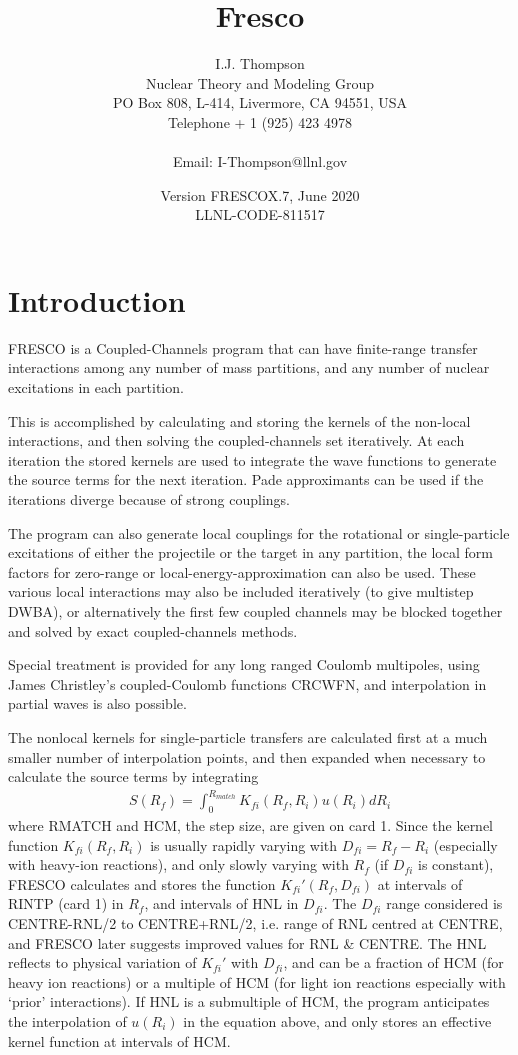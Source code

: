 \documentclass[11pt]{article}
\title{\Huge Fresco}
\date{Version FRESCOX.7, June 2020\\ LLNL-CODE-811517 }
\author{I.J. Thompson
%
\\Nuclear Theory and Modeling Group
\\PO Box 808, L-414,
 Livermore, CA 94551, USA
\\Telephone + 1 (925) 423 4978
\\ %
\\Email: I-Thompson@llnl.gov}
\newcommand{\beqn}{\begin{eqnarray*}}
\newcommand{\eeqn}{\end{eqnarray*}}
\begin{document}
\maketitle
\section{Introduction}

{\large
\parskip 5pt
\parindent 10pt

FRESCO is a Coupled-Channels program that can have finite-range
transfer interactions among any number of mass partitions, and any
number of nuclear excitations in each partition.

This is accomplished by calculating and storing the kernels of the
non-local interactions, and then solving the coupled-channels set
iteratively.
At each iteration the stored kernels are used to integrate the wave
functions to generate the source terms for the next iteration.
Pade approximants can be used if the iterations diverge because of
strong couplings.

The program can also generate local couplings for the rotational
or single-particle excitations of either the projectile or the
target in any partition,
the local form factors for zero-range or local-energy-approximation
can also be used.
These various local interactions may also be included iteratively
(to give multistep DWBA), or alternatively the first few coupled
channels may be blocked together and solved by exact coupled-channels
methods.

Special treatment is provided for any long ranged Coulomb multipoles,
using James Christley's coupled-Coulomb functions CRCWFN,
and interpolation in partial waves is also possible.

The nonlocal kernels for single-particle transfers are calculated first
at a much smaller number of interpolation points,
and then expanded when necessary to calculate the source terms by
integrating
\beqn
S(R _ f ) = \int _ 0 ^ {R _ {match}}
                K _ {fi} (R _ f , R _ i ) u(R _ i ) dR _ i
\eeqn
where RMATCH and HCM, the step size, are given on card 1.
Since the kernel function $K_{fi}(R_f,R_i)$ is usually rapidly varying with
$D_{fi} = R_{f} - R_{i}$ (especially with heavy-ion reactions), and only slowly
varying with $R_{f}$ (if $D_{fi}$ is constant),  FRESCO calculates and stores
the function $K_{fi}'(R_{f},D_{fi})$ at intervals of RINTP (card 1) in $R_{f}$,
and intervals of HNL in $D_{fi}$. The $D_{fi}$ range considered is
CENTRE-RNL/2 to CENTRE+RNL/2, i.e. range of RNL centred at CENTRE,
and FRESCO later suggests improved values for RNL \& CENTRE.
The HNL reflects to physical variation of $K_{fi}'$ with $D_{fi}$, and can be
a fraction of HCM (for heavy ion reactions) or a multiple of HCM
(for light ion reactions especially with `prior' interactions).
If HNL is a submultiple of HCM, the program anticipates the interpolation
of $u(R_{i})$ in the equation above, and only stores an effective kernel
function at intervals of HCM.

}
\end{document}
